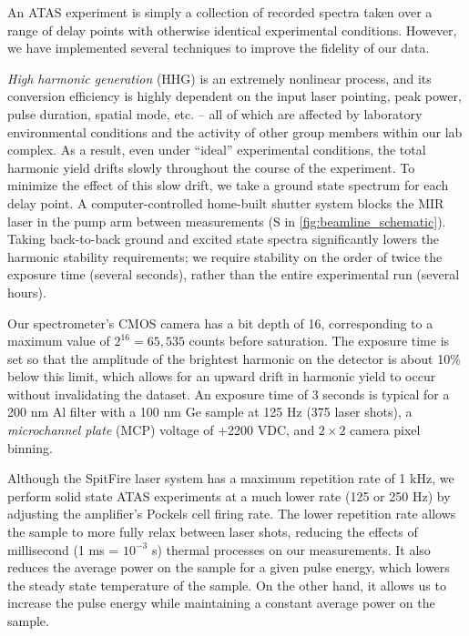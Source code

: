 An ATAS experiment is simply a collection of recorded spectra taken over a range of delay points with otherwise identical experimental conditions. However, we have implemented several techniques to improve the fidelity of our data.

\textit{High harmonic generation} (HHG) is an extremely nonlinear process, and its conversion efficiency is highly dependent on the input laser pointing, peak power, pulse duration, spatial mode, etc. -- all of which are affected by laboratory environmental conditions and the activity of other group members within our lab complex. As a result, even under ``ideal'' experimental conditions, the total harmonic yield drifts slowly throughout the course of the experiment. To minimize the effect of this slow drift, we take a ground state spectrum for each delay point. A computer-controlled home-built shutter system blocks the MIR laser in the pump arm between measurements (S in \cref{fig:beamline_schematic}). Taking back-to-back ground and excited state spectra significantly lowers the harmonic stability requirements; we require stability on the order of twice the exposure time (several seconds), rather than the entire experimental run (several hours).

Our spectrometer's CMOS camera has a bit depth of 16, corresponding to a maximum value of $2^{16} = 65,535$ counts before saturation. The exposure time is set so that the amplitude of the brightest harmonic on the detector is about 10\% below this limit, which allows for an upward drift in harmonic yield to occur without invalidating the dataset. An exposure time of 3 seconds is typical for a 200 nm Al filter with a 100 nm Ge sample at 125 Hz (375 laser shots), a \textit{microchannel plate} (MCP) voltage of +2200 VDC, and $2 \times 2$ camera pixel binning.

Although the SpitFire laser system has a maximum repetition rate of 1 kHz, we perform solid state ATAS experiments at a much lower rate (125 or 250 Hz) by adjusting the amplifier's Pockels cell firing rate. The lower repetition rate allows the sample to more fully relax between laser shots, reducing the effects of millisecond (1 ms = $10^{-3}$ s) thermal processes on our measurements. It also reduces the average power on the sample for a given pulse energy, which lowers the steady state temperature of the sample. On the other hand, it allows us to increase the pulse energy while maintaining a constant average power on the sample.

